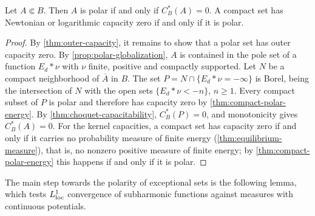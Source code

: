 \begin{corollary}\label{cor:polar-zero-capacity}
Let $A\Subset B$. Then $A$ is polar if and only if $C_B^*(A)=0$. A compact set has Newtonian or logarithmic capacity zero if and only if it is polar.
\end{corollary}
\begin{proof}
By \cref{thm:outer-capacity}, it remains to show that a polar set has outer capacity zero. By \cref{prop:polar-globalization}, $A$ is contained in the pole set of a function $E_d*\nu$ with $\nu$ finite, positive and compactly supported. Let $N$ be a compact neighborhood of $\overline A$ in $B$. The set $P=N\cap\{E_d*\nu=-\infty\}$ is Borel, being the intersection of $N$ with the open sets $\{E_d*\nu<-n\}$, $n\geq1$. Every compact subset of $P$ is polar and therefore has capacity zero by \cref{thm:compact-polar-energy}. By \cref{thm:choquet-capacitability}, $C_B^*(P)=0$, and monotonicity gives $C_B^*(A)=0$. For the kernel capacities, a compact set has capacity zero if and only if it carries no probability measure of finite energy (\cref{thm:equilibrium-measure}), that is, no nonzero positive measure of finite energy; by \cref{thm:compact-polar-energy} this happens if and only if it is polar.
\end{proof}

The main step towards the polarity of exceptional sets is the following lemma, which tests $L^1_{\mathrm{loc}}$ convergence of subharmonic functions against measures with continuous potentials.

